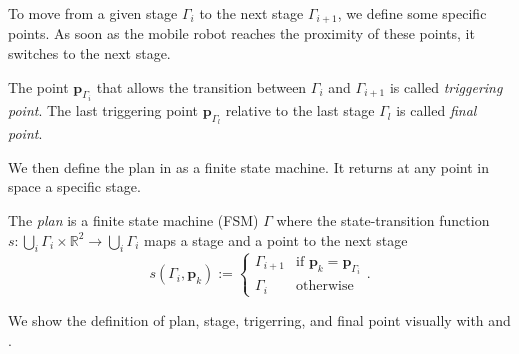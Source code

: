 To move from a given stage $\Gamma_i$ to the next stage $\Gamma_{i+1}$, we define some specific points. As soon as the mobile robot reaches the proximity of these points, it switches to the next stage.

\begin{highlight}  
  \begin{defn}\label{def:trigs}
    The point $\mathbf{p}_{\Gamma_{i}}$ that allows the transition between $\Gamma_i$ and $\Gamma_{i+1}$ is called \emph{triggering point}. The last triggering point $\mathbf{p}_{\Gamma_{l}}$ relative to the last stage $\Gamma_l$ is called \emph{final point}.
  \end{defn}
\end{highlight}

We then define the plan in  as a finite state machine. It returns at any point in space a specific stage.

\begin{highlight}  
  \begin{defn}[Plan]\label{def:plan}
    The \emph{plan} is a finite state machine (FSM) $\Gamma$ where the state-transition function $s:\bigcup_i{\Gamma_i}\times\mathbb{R}^2\rightarrow\bigcup_i{\Gamma_i}$ maps a stage and a point to the next stage
    \begin{equation*}s(\Gamma_i,\mathbf{p}_k):=\begin{cases}
      \Gamma_{i+1} & \text{if }\mathbf{p}_k=\mathbf{p}_{\Gamma_i}\\
      \Gamma_i & \text{otherwise}
    \end{cases}.\end{equation*}
  \end{defn}
\end{highlight}

We show the definition of plan, stage, trigerring, and final point visually with  and .

